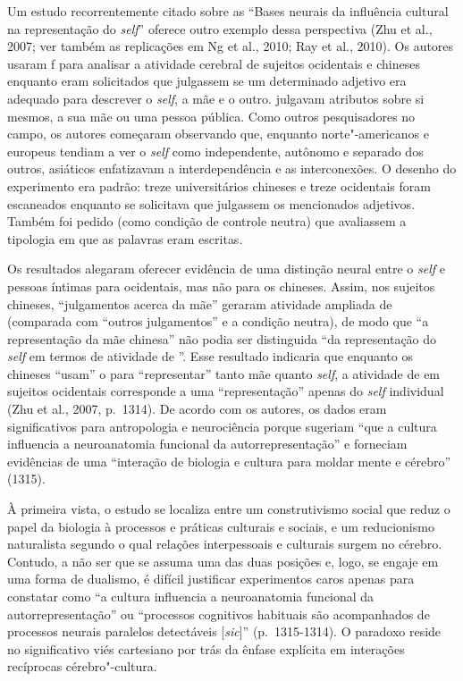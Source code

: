 Um estudo recorrentemente citado sobre as ``Bases neurais da influência
cultural na representação do \emph{self}'' oferece outro exemplo dessa
perspectiva (Zhu et al., 2007; ver também as replicações em Ng et al.,
2010; Ray et al., 2010). Os autores usaram f para analisar a
atividade cerebral de sujeitos ocidentais e chineses enquanto eram
solicitados que julgassem se um determinado adjetivo era adequado para
descrever o \emph{self}, a mãe e o outro. julgavam atributos sobre si mesmos, a
sua mãe ou uma pessoa pública. Como outros pesquisadores no campo, os
autores começaram observando que, enquanto norte"-americanos e europeus
tendiam a ver o \emph{self} como independente, autônomo e separado dos outros,
asiáticos enfatizavam a interdependência e as interconexões. O desenho
do experimento era padrão: treze universitários chineses e treze
ocidentais foram escaneados enquanto se solicitava que julgassem os
mencionados adjetivos. Também foi pedido (como condição de controle
neutra) que avaliassem a tipologia em que as palavras eram escritas.

Os resultados alegaram oferecer evidência de uma distinção neural entre
o \emph{self} e pessoas íntimas para ocidentais, mas não para os chineses.
Assim, nos sujeitos chineses, ``julgamentos acerca da mãe'' geraram
atividade ampliada de  (comparada com ``outros julgamentos'' e a
condição neutra), de modo que ``a representação da mãe chinesa'' não
podia ser distinguida ``da representação do \emph{self} em termos de atividade
de ''. Esse resultado indicaria que enquanto os chineses ``usam'' o
 para ``representar'' tanto mãe quanto \emph{self}, a atividade de  em
sujeitos ocidentais corresponde a uma ``representação'' apenas do \emph{self}
individual (Zhu et al., 2007, p.~1314). De acordo com os autores, os
dados eram significativos para antropologia e neurociência porque
sugeriam ``que a cultura influencia a neuroanatomia funcional da
autorrepresentação'' e forneciam evidências de uma ``interação de
biologia e cultura para moldar mente e cérebro'' (1315).

À primeira vista, o estudo se localiza entre um construtivismo social
que reduz o papel da biologia à processos e práticas culturais e
sociais, e um reducionismo naturalista segundo o qual relações
interpessoais e culturais surgem no cérebro. Contudo, a não ser que se
assuma uma das duas posições e, logo, se engaje em uma forma de
dualismo, é difícil justificar experimentos caros apenas para constatar
como ``a cultura influencia a neuroanatomia funcional da
autorrepresentação'' ou ``processos cognitivos habituais são
acompanhados de processos neurais paralelos detectáveis
{[}\emph{sic}{]}'' (p.~1315-1314). O paradoxo reside no significativo
viés cartesiano por trás da ênfase explícita em interações recíprocas
cérebro"-cultura.

